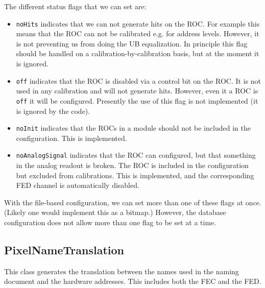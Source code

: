The different status flags that we can set are:
\begin{itemize}
\item {\tt noHits} indicates that we can not generate hits on the ROC.
      For example this means that the ROC can not be calibrated
      e.g. for address levels. However, it is not preventing us from
      doing the UB equalization. In principle this flag should be
      handled on a calibration-by-calibration basis, but at the moment
      it is ignored.
\item {\tt off} indicates that the ROC is disabled via a control bit on the ROC.
                It is not used in any calibration and will not generate hits.
                However, even it a ROC is {\tt off} it will be
                configured. Presently the use of this flag is not implemented (it is ignored by the code).
\item {\tt noInit} indicates that the ROCs in a module should not be included in the configuration.
		This is implemented.
\item {\tt noAnalogSignal}  indicates that the ROC can configured, but that something in the analog readout is broken. The ROC is included in the configuration but excluded from calibrations. This is implemented, and the corresponding FED channel is automatically disabled.
\end{itemize}
With the file-based configuration, we can set more than one of these
flags at once. (Likely one would implement this as a bitmap.) However,
the database configuration does not allow more than one flag
to be set at a time.


\subsection{PixelNameTranslation}

This class generates the translation between the names used in the 
naming document and the hardware addresses. This includes both the
FEC and the FED.

